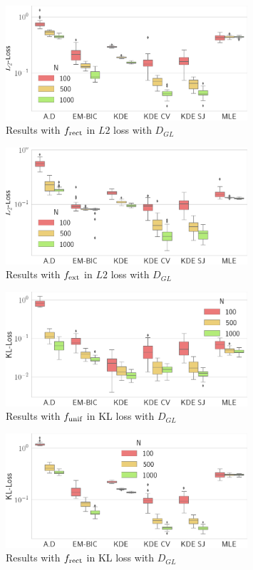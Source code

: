 \begin{figure}
\center
    \includegraphics[width=0.8\textwidth]{./TeX_files/res_rect_L2_GL.png}
    \caption{Results with $f_{\textnormal{rect}}$ in $L2$ loss with $D_{GL}$}
    \label{fig:res_rect_L2_GL}
\end{figure}
\begin{figure}
\center
    \includegraphics[width=0.8\textwidth]{./TeX_files/res_lapl_gauss_not_dict_L2_GL.png}
    \caption{Results with $f_{\textnormal{ext}}$ in $L2$ loss with $D_{GL}$}
    \label{fig:res_ext_L2_GL}
\end{figure}
\begin{figure}
\center
    \includegraphics[width=0.8\textwidth]{./TeX_files/res_uniform_KL_GL.png}
    \caption{Results with $f_{\textnormal{unif}}$ in KL loss with $D_{GL}$}
    \label{fig:res_uniform_KL_GL}
\end{figure}
\begin{figure}
\center
    \includegraphics[width=0.8\textwidth]{./TeX_files/res_rect_KL_GL.png}
    \caption{Results with $f_{\textnormal{rect}}$ in KL loss with $D_{GL}$}
    \label{fig:res_rect_KL_GL}
\end{figure}   
